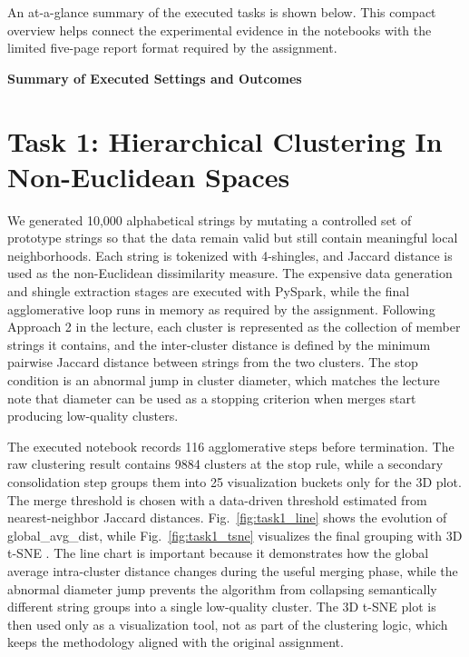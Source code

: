\documentclass[conference]{IEEEtran}
\begin{document}
An at-a-glance summary of the executed tasks is shown below. 
This compact overview helps connect the experimental evidence in the notebooks with the limited five-page report format required by the assignment.

\begin{center}
\scriptsize
\textbf{Summary of Executed Settings and Outcomes}\\[2pt]
\setlength{\tabcolsep}{3pt}
\end{center}

\section{Task 1: Hierarchical Clustering In Non-Euclidean Spaces}
We generated 10,000 alphabetical strings by mutating a controlled set of prototype strings so that the data remain valid but still contain meaningful local neighborhoods. 
Each string is tokenized with 4-shingles, and Jaccard distance \cite{jaccard1901} is used as the non-Euclidean dissimilarity measure. 
The expensive data generation and shingle extraction stages are executed with PySpark, while the final agglomerative loop runs in memory as required by the assignment. 
Following Approach 2 in the lecture, each cluster is represented as the collection of member strings it contains, and the inter-cluster distance is defined by the minimum pairwise Jaccard distance between strings from the two clusters. 
The stop condition is an abnormal jump in cluster diameter, which matches the lecture note that diameter can be used as a stopping criterion when merges start producing low-quality clusters.

The executed notebook records 116 agglomerative steps before termination. 
The raw clustering result contains 9884 clusters at the stop rule, while a secondary consolidation step groups them into 25 visualization buckets only for the 3D plot. 
The merge threshold is chosen with a data-driven threshold estimated from nearest-neighbor Jaccard distances. Fig.~\ref{fig:task1_line} shows the evolution of global\_avg\_dist, while Fig.~\ref{fig:task1_tsne} visualizes the final grouping with 3D t-SNE \cite{van2008tsne}.
The line chart is important because it demonstrates how the global average intra-cluster distance changes during the useful merging phase, while the abnormal diameter jump prevents the algorithm from collapsing semantically different string groups into a single low-quality cluster. 
The 3D t-SNE plot is then used only as a visualization tool, not as part of the clustering logic, which keeps the methodology aligned with the original assignment.
\end{document}
